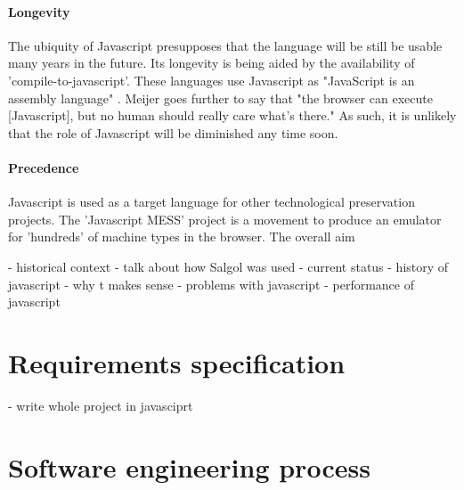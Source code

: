 \documentclass{article}
\begin{document}
\paragraph{Longevity} The ubiquity of Javascript presupposes that the language will be still be usable many years in the future. Its longevity is being aided by the availability of 'compile-to-javascript'. These languages use Javascript as "JavaScript is an assembly language" \cite{hanselman}. Meijer goes further to say that "the browser can execute [Javascript], but no human should really care what’s there." As such, it is unlikely that the role of Javascript will be diminished any time soon.

\paragraph{Precedence} Javascript is used as a target language for other technological preservation projects. The 'Javascript MESS' project is a movement to produce an emulator for 'hundreds' of machine types in the browser. The overall aim 


- historical context
- talk about how Salgol was used
- current status
- history of javascript
- why t makes sense
- problems with javascript
- performance of javascript


\section{Requirements specification}

-  write whole project in javasciprt

\section{Software engineering process}
\end{document}
